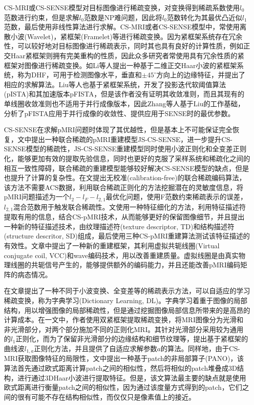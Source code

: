 \documentclass[UTF8]{article}
\begin{document}
\par CS-MRI或CS-SENSE模型对目标图像进行稀疏变换，对变换得到稀疏系数使用$l_0$范数进行约束，但是求解$l_0$范数是NP难问题，因此将$l_0$范数转化为其最优凸近似$l_1$范数，最后使用非线性算法进行求解。CS-MRI或者CS-SENSE模型中，常使用离散小波(Wavelet)，紧框架(Framelet)等进行稀疏变换。因为紧框架系统存在冗余性，可以较好地对目标图像进行稀疏表示，同时其也具有良好的计算性质，例如正交Haar紧框架则拥有完美重构的性质，因此众多研究者常使用具有冗余性质的紧框架对图像进行稀疏变换。如Li等人提出一种基于二维正交Haar小波的紧框架系统，称为DHF\cite{li2016adaptive}，可用于检测图像水平，垂直和$\pm 45^{\circ}$方向上的边缘特征，并提出了相应的求解算法。Liu等人也基于紧框架系统，开发了投影迭代软阈值算法(pISTA)\cite{7448403}和其加速版本pFISTA，但是该作者没有证明其收敛准则，而且其现有的单线圈收敛准则也不适用于并行成像版本，因此Zhang等人\cite{ZHANG2021101987}基于Liu的工作基础，分析了pFISTA应用于并行成像的收敛性、提供应用于SENSE时的最优参数。
\par CS-SENSE在求解pMRI问题时体现了其优越性，但是基本上不可能保证完全恢复，文\cite{chun2015efficient}中提出一种联合稀疏的pMRI重建模型JS-CS-SENSE，进一步提升CS-SENSE模型的稀疏性，JS-CS-SENSE重建模型同时使用小波正则化和全变差正则化，能够更加有效的提取先验信息，同时也更好的克服了采样系统和稀疏化之间的相互一致性障碍，联合稀疏的重建模型能够较好解决CS-SENSE模型的缺点，但是也提升了计算的复杂性。在文\cite{wang2017learning}提出无校准(calibration-free)的联合稀疏编码算法，该方法不需要ACS数据，利用联合稀疏正则化的方法挖掘潜在的灵敏度信息，将pMRI问题描述为一个$l_2-l_F-l_{2,1}$最优化问题，使用F范数约束稀疏表示的误差，$l_{2,1}$混合范数用于触发联合稀疏性。文\cite{cheng2018improved}使用一种特征细化的方法，利用特征描述符提取有用的信息，结合CS-pMRI技术，从而能够更好的保留图像细节，并且提出一种新的特征描述技术，由纹理描述符(texture descriptor, TD)和结构描述符(structure descritor, SD)组成，最后使用三种CS-pMRI重建算法测试该特征描述的有效性。文章\cite{qiu2021highly}中提出了一种新的重建框架，其利用虚拟共轭线圈(Virtual conjugate coil, VCC)\cite{blaimer2009virtual}和wave编码技术，用以改善重建质量。虚拟线圈是由真实物理线圈的共轭信号产生的，能够提供额外的编码能力，并且还能改善pMRI编码矩阵的病态情况。
\par 在文章\cite{ravishankar2010mr}提出了一种不同于小波变换、全变差等的稀疏表示方法，可以自适应的学习稀疏变换，称为字典学习(Dictionary Learning, DL)。字典学习着重于图像的局部结构，用以增强图像的局部稀疏性，但是通过挖掘图像局部信息所带来的是高昂的计算成本。在\cite{chen2020new}一文中，作者使用双紧框架提取稀疏变换，将MRI图像分为光滑和非光滑部分，对两个部分施加不同的正则化MRI。其针对光滑部分采用较为通用的$l_{1}$正则化，而为了保留非光滑部分的边缘结构和细节纹理等，提出基于紧框架的曲线波$l_{1,a}$正则化方法，并且提供了自适应求解参数$a$的算法。同样地，由于CS-MRI获取图像特征的局限性，文\cite{qu2014magnetic}中提出一种基于patch的非局部算子(PANO)，该算法首先通过欧式距离计算patch之间的相似性，然后将相似的patch堆叠成3D结构，进行通过3DHaar小波进行提取特征。但是，该文算法最主要的缺点就是使用欧式距离进行衡量patch之间的相似性，因为通过该度量方式得到的patch，它们之间的很有可能不存在结构相似性，而仅仅只是像素值上的接近。
\end{document}
